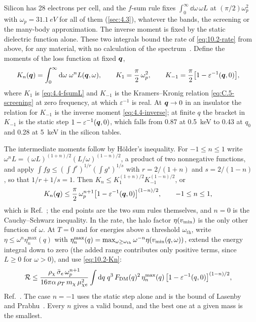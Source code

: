 Silicon has 28 electrons per cell, and the $f$-sum rule fixes $\int_0^\infty\dd\omega\,\omega L$ at $(\pi/2)\omega_p^2$ with $\omega_p = \SI{31.1}{eV}$ for all of them (\cref{sec:4.3}), whatever the bands, the screening or the many-body approximation. The inverse moment is fixed by the static dielectric function alone. These two integrals bound the rate of \cref{eq:10.2-rate} from above, for any material, with no calculation of the spectrum~\cites{lasenby2022dark}{barker2026first}. Define the moments of the loss function at fixed $\bm{q}$,
\begin{equation}
  K_n(\bm{q}) = \int_0^\infty\mathrm{d}\omega\;\omega^n L(\bm{q},\omega) , \qquad
  K_1 = \frac{\pi}{2}\,\omega_p^2 , \qquad K_{-1} = \frac{\pi}{2}\bigl[1 - \varepsilon^{-1}(\bm{q},0)\bigr] ,
  \label{eq:10.2-moments}
\end{equation}
where $K_1$ is \cref{eq:4.4-fsumL} and $K_{-1}$ is the Kramers--Kronig relation \cref{eq:C.5-screening} at zero frequency, at which $\varepsilon^{-1}$ is real. At $\bm{q} \to 0$ in an insulator the relation for $K_{-1}$ is the inverse moment \cref{eq:4.4-inverse}; at finite $q$ the bracket in $K_{-1}$ is the static step $1 - \varepsilon^{-1}(\bm{q},0)$, which falls from 0.87 at \SI{0.5}{keV} to 0.43 at $q_0$ and 0.28 at \SI{5}{keV} in the silicon tables.

The intermediate moments follow by Hölder's inequality. For $-1 \le n \le 1$ write $\omega^nL = (\omega L)^{(1+n)/2}(L/\omega)^{(1-n)/2}$, a product of two nonnegative functions, and apply $\int fg \le (\int f^r)^{1/r}(\int g^s)^{1/s}$ with $r = 2/(1+n)$ and $s = 2/(1-n)$, so that $1/r + 1/s = 1$. Then $K_n \le K_1^{(1+n)/2}K_{-1}^{(1-n)/2}$, or
\begin{equation}
  K_n(\bm{q}) \le \frac{\pi}{2}\,\omega_p^{n+1}\bigl[1 - \varepsilon^{-1}(\bm{q},0)\bigr]^{(1-n)/2} , \qquad -1 \le n \le 1 ,
  \label{eq:10.2-Kn}
\end{equation}
which is Ref.~\cite[Eq.~(8)]{barker2026first}; the end points are the two sum rules themselves, and $n = 0$ is the Cauchy--Schwarz inequality. In the rate, the halo factor $\eta(v_{\mathrm{min}})$ is the only other function of $\omega$. At $T = 0$ and for energies above a threshold $\omega_{\mathrm{th}}$, write $\eta \le \omega^n\eta_n^{\max}(q)$ with $\eta_n^{\max}(q) = \max_{\omega \ge \omega_{\mathrm{th}}}\omega^{-n}\eta(v_{\mathrm{min}}(q,\omega))$, extend the energy integral down to zero (the added range contributes only positive terms, since $L \ge 0$ for $\omega > 0$), and use \cref{eq:10.2-Kn}:
\begin{equation}
  \mathcal{R} \le \frac{\rho_\chi\,\bar{\sigma}_{e}\,\omega_p^{n+1}}{16\pi\alpha\,\rho_T\,m_{\chi}\,\mu_{\chi e}^2}\int\mathrm{d} q\;q^3\,F_{\mathrm{DM}}(q)^2\,\eta_n^{\max}(q)\,\bigl[1 - \varepsilon^{-1}(q,0)\bigr]^{(1-n)/2} ,
  \label{eq:10.2-bound}
\end{equation}
Ref.~\cite[Eq.~(9)]{barker2026first}. The case $n = -1$ uses the static step alone and is the bound of Lasenby and Prabhu~\cite[Eqs.~(8) and (9)]{lasenby2022dark}. Every $n$ gives a valid bound, and the best one at a given mass is the smallest.

